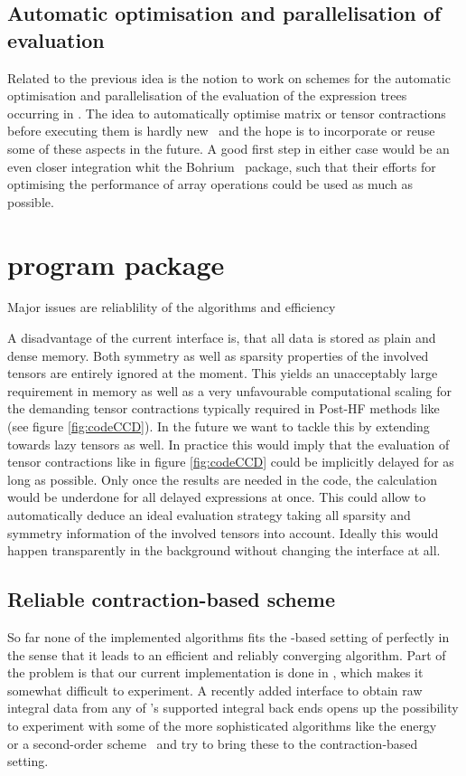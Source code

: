 \subsection{Automatic optimisation and parallelisation of evaluation}
Related to the previous idea
is the notion to work on schemes for the automatic
optimisation and parallelisation of the evaluation
of the expression trees occurring in \lazyten.
The idea to automatically optimise matrix or tensor contractions
before executing them is hardly new~\cite{Baumgartner2005,Peise2015,Xerus,Kristensen2016array,Kristensen2016streaming}
and the hope is to incorporate or reuse some of these aspects
in the future.
A good first step in either case would be an even closer integration
whit the Bohrium~\cite{Kristensen2016array,Kristensen2016streaming} package,
such that their efforts for optimising the performance
of array operations could be used as much as possible.


\section{\molsturm program package}

Major issues are reliablility of the algorithms
and efficiency

A disadvantage of the current \molsturm interface is,
that all data is stored as plain and dense memory.
Both symmetry as well as sparsity properties of the involved tensors
are entirely ignored at the moment.
This yields an unacceptably large requirement in memory
as well as a very unfavourable computational scaling
for the demanding tensor contractions
typically required in Post-HF methods like \CCD (see figure \ref{fig:codeCCD}).
In the future we want to tackle this by extending
\lazyten towards lazy tensors as well.
In practice this would imply that the evaluation of
tensor contractions like in figure \ref{fig:codeCCD} could be implicitly delayed
for as long as possible.
Only once the results are needed in the code,
the calculation would be underdone
for all delayed expressions at once.
This could allow to automatically deduce an ideal evaluation strategy
taking all sparsity and symmetry information
of the involved tensors into account.
Ideally this would happen transparently in the background
without changing the \python interface at all.


\subsection{Reliable contraction-based \SCF scheme}
So far none of the implemented \SCF algorithms fits the \contraction-based
setting of \molsturm perfectly
in the sense that it leads to an efficient
and reliably converging \SCF algorithm.
Part of the problem is that our current \SCF implementation
is done in \cpp,
which makes it somewhat difficult to experiment.
A recently added \python interface to obtain raw integral data
from any of \molsturm's supported integral back ends
opens up the possibility to experiment
with some of the more sophisticated algorithms like
the energy \DIIS~\cite{Kudin2002}
or a second-order \SCF scheme~\cite{Salek2007,Hoest2008}
and try to bring these to the contraction-based setting.


